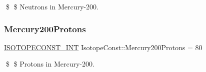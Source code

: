 \$ \$ Neutrons in Mercury-\/200. \mbox{\label{group___isotope_const-_mercury-_hg200_gafd85b90c2059ac20ba9bb72d7abf1901}} 
\subsubsection{\texorpdfstring{Mercury200\+Protons}{Mercury200Protons}}
{\footnotesize\ttfamily \mbox{\hyperlink{group___isotope_const-_macros_ga5f18360b3e99483a35c32d789e62621c}{I\+S\+O\+T\+O\+P\+E\+C\+O\+N\+S\+T\+\_\+\+I\+NT}} Isotope\+Const\+::\+Mercury200\+Protons = 80}

\$ \$ Protons in Mercury-\/200. 
